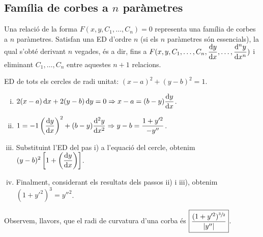 \subsection{Família de corbes a $n$ paràmetres}
\begin{defi}
	Una relació de la forma $F(x,y,C_{1}, \dots, C_{n}) = 0$ representa una família de corbes a $n$ paràmetres. Satisfan una ED d'ordre $n$ (si els $n$ paràmetres són essencials), la qual s'obté derivant $n$ vegades, és a dir, fins a $\displaystyle F(x,y,C_{1}, \dots, C_{n}, \frac{\mathrm{d} y}{\mathrm{d} x}, \dots , \frac{\mathrm{d}^{n} y}{\mathrm{d} x^{n}})$ i eliminant $C_{1}, \dots , C_{n}$ entre aquestes $n+1$ relacions.
\end{defi}
\begin{example}
	ED de tots els cercles de radi unitat: $(x-a)^{2} + (y-b)^{2} = 1$.
	\begin{enumerate}[i)]
	    \item $\displaystyle 2(x-a) \mathop{}\!\mathrm{d} x + 2 (y-b) \mathop{}\!\mathrm{d} y = 0 \Rightarrow x-a = (b-y) \frac{\mathrm{d} y}{\mathrm{d} x}$.
	    \item $\displaystyle 1 = -1 \left( \frac{\mathrm{d} y}{\mathrm{d} x} \right)^{2} + (b-y) \frac{\mathrm{d}^{2} y}{\mathrm{d} x^{2}} \Rightarrow y-b = \frac{1+y'^{2}}{-y''}$.
	    \item Substituint l'ED del pas i) a l'equació del cercle, obtenim $\displaystyle (y-b)^{2} \left[ 1 + \left( \frac{\mathrm{d} y}{\mathrm{d} x} \right) \right]$.
	    \item Finalment, considerant els resultats dels passos ii) i iii), obtenim $\boxed{(1 + y'^{2})^{3} = y''^{2}}$.
	\end{enumerate}
	Observem, llavors, que el radi de curvatura d'una corba és $\boxed{\frac{(1 + y'^{2})^{\sfrac{3}{2}}}{|y''|}}$.
\end{example}

